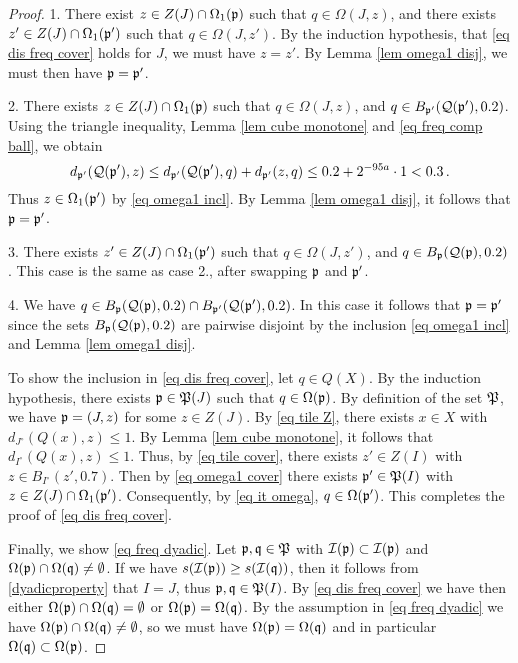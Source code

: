 \begin{proof}
    1. There exist $z \in Z(J) \cap \Omega_1(\mathfrak p)$ such that $q \in \Omega(J, z)$, and there exists $z' \in Z(J) \cap \Omega_1(\mathfrak p')$ such that $q \in \Omega(J, z')$. By the induction hypothesis, that \eqref{eq dis freq cover} holds for $J$, we must have $z = z'$. By Lemma \ref{lem omega1 disj}, we must then have $\mathfrak p = \mathfrak p'$.

    2. There exists $z \in Z(J) \cap \Omega_1(\mathfrak p)$ such that $q \in \Omega(J,z)$, and $q \in B_{\mathfrak p'}(\mathcal{Q}(\mathfrak p'), 0.2)$.  Using the triangle inequality, Lemma \ref{lem cube monotone} and \eqref{eq freq comp ball}, we obtain
    $$
        d_{\mathfrak p'}(\mathcal{Q}(\mathfrak p'),z) \le d_{\mathfrak p'}(\mathcal{Q}(\mathfrak p'), q) + d_{\mathfrak p'}(z, q) \le 0.2 + 2^{-95a} \cdot 1 < 0.3\,.
    $$
    Thus $z \in \Omega_1(\mathfrak p')$ by \eqref{eq omega1 incl}. By Lemma \ref{lem omega1 disj}, it follows that $\mathfrak p = \mathfrak p'$.

    3. There exists $z' \in Z(J) \cap \Omega_1(\mathfrak p')$ such that $q \in \Omega(J,z')$, and $q \in B_{\mathfrak p}(\mathcal{Q}(\mathfrak p), 0.2)$. This case is the same as case 2., after swapping $\mathfrak p$ and $\mathfrak p'$.

    4. We have $q \in B_{\mathfrak p}(\mathcal{Q}(\mathfrak p), 0.2) \cap B_{\mathfrak p'}(\mathcal{Q}(\mathfrak p'), 0.2)$. In this case it follows that $\mathfrak p = \mathfrak p'$ since the sets $B_{\mathfrak p}(\mathcal{Q}(\mathfrak p), 0.2)$ are pairwise disjoint by the inclusion \eqref{eq omega1 incl} and Lemma \ref{lem omega1 disj}.

    To show the inclusion in \eqref{eq dis freq cover}, let $q \in Q(X)$. By the induction hypothesis, there exists $\mathfrak p \in \mathfrak P(J)$ such that $q \in \Omega(\mathfrak p)$. By definition of the set $\mathfrak P$, we have $\mathfrak p = (J, z)$ for some $z \in Z(J)$. By \eqref{eq tile Z}, there exists $x \in X$ with $d_{J^\circ}(Q(x), z) \le 1$. By Lemma \ref{lem cube monotone}, it follows that $d_{I^\circ}(Q(x), z) \le 1$.
    Thus, by \eqref{eq tile cover}, there exists $z' \in Z(I)$ with $z \in B_{I^\circ}(z', 0.7)$. Then by \eqref{eq omega1 cover} there exists $\mathfrak p' \in \mathfrak P(I)$ with $z \in Z(J) \cap \Omega_1(\mathfrak p')$. Consequently, by \eqref{eq it omega}, $q \in \Omega(\mathfrak p')$. This completes the proof of \eqref{eq dis freq cover}.

    Finally, we show \eqref{eq freq dyadic}. Let $\mathfrak p, \mathfrak q \in \mathfrak P$ with $\mathcal{I}(\mathfrak p) \subset \mathcal{I}(\mathfrak p)$ and $\Omega(\mathfrak p) \cap \Omega(\mathfrak q) \ne \emptyset$. If we have $s(\mathcal{I}(\mathfrak p)) \ge s(\mathcal{I}(\mathfrak q))$, then it follows from \eqref{dyadicproperty} that $I = J$, thus $\mathfrak p, \mathfrak q \in \mathfrak P(I)$. By \eqref{eq dis freq cover} we have then either $\Omega(\mathfrak p) \cap \Omega(\mathfrak q) = \emptyset$ or $\Omega(\mathfrak p) = \Omega(\mathfrak q)$. By the assumption in \eqref{eq freq dyadic} we have $\Omega(\mathfrak p) \cap \Omega(\mathfrak q) \ne \emptyset$, so we must have $\Omega(\mathfrak p) = \Omega(\mathfrak q)$ and in particular $\Omega(\mathfrak q) \subset \Omega(\mathfrak p)$.


\end{proof}
